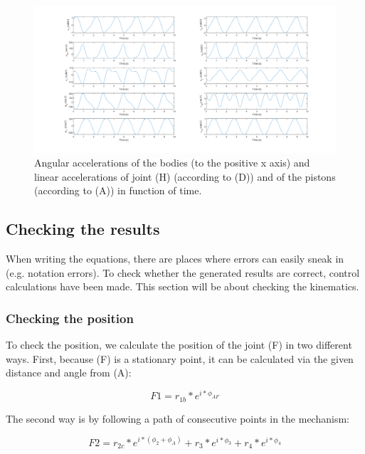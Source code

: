 \documentclass[a4paper]{article}
\begin{document}
\begin{figure}[h]
	\centering
	
	\includegraphics[width = \textwidth]{kinacc.png}
	
	\caption{Angular accelerations of the bodies (to the positive x axis) and linear accelerations of joint (H) (according to (D)) and of the pistons (according to (A)) in function of time.}
	\label{fig:kinacc}
	
\end{figure}

\clearpage

\subsection{Checking the results}

When writing the equations, there are places where errors can easily sneak in (e.g. notation errors). To check whether the generated results are correct, control calculations have been made. This section will be about checking the kinematics.

\subsubsection{Checking the position}

To check the position, we calculate the position of the joint (F) in two different ways. First, because (F) is a stationary point, it can be calculated via the given distance and angle from (A):

\begin{equation}
	F1 = r_{1b}*e^{i*\phi_{AF}}
\end{equation}

The second way is by following a path of consecutive points in the mechanism:

\begin{equation}
	F2 = r_{2c}*e^{i*(\phi_2 + \phi_A)} + r_3*e^{i*\phi_3} + r_4*e^{i*\phi_4}
\end{equation}
\end{document}
